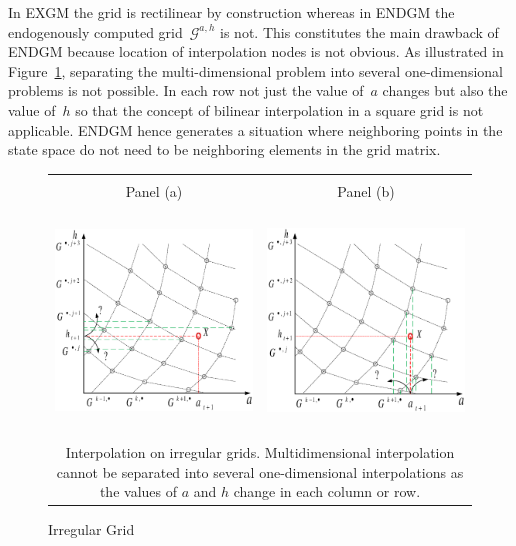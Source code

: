 \documentclass[a4paper,12pt]{article}%
\begin{document}
In EXGM the grid is rectilinear by construction whereas in ENDGM the endogenously computed grid~$\mathcal{G}^{a,h}$ is not. This constitutes the main drawback of ENDGM because location of interpolation nodes is not obvious. As illustrated in Figure~\ref{Irregular_Grid}, separating the multi-dimensional problem into several one-dimensional problems is not possible. In each row not just the value of~$a$ changes but also the value of~$h$ so that the concept of bilinear interpolation in a square grid is not applicable. ENDGM hence generates a situation where neighboring points in the state space do not need to be neighboring elements in the grid matrix. 
\begin{figure}[htb] \centering
\caption{Irregular Grid}
\begin{tabular}
[c]{cc}
& \\
Panel (a) & Panel (b)\\
{\includegraphics[height=6.0cm, width=7.5cm]{Abbildungen/endo_grid_1.eps}} &
{\includegraphics[height=6.0cm, width=7.5cm]{Abbildungen/endo_grid_2.eps}} \\
\multicolumn{2}{p{15cm}}{{\footnotesize Interpolation on irregular grids. Multidimensional interpolation cannot be separated into several one-dimensional interpolations as the values of $a$ and $h$ change in each column or row.}}
\end{tabular}
\label{Irregular_Grid}
\end{figure}
\end{document}
